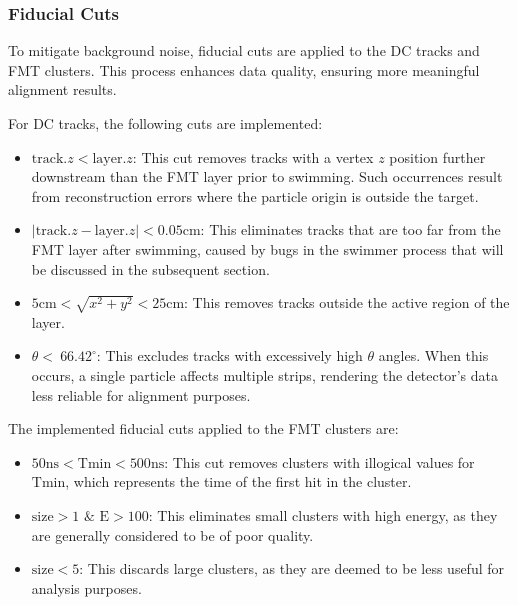 \subsubsection{Fiducial Cuts}
\label{sssec::fiducial_cuts}
    To mitigate background noise, fiducial cuts are applied to the DC tracks and FMT clusters.
    This process enhances data quality, ensuring more meaningful alignment results.

    For DC tracks, the following cuts are implemented:
    \begin{itemize}
        \item
            $\text{track}.z < \text{layer}.z$:
            This cut removes tracks with a vertex $z$ position further downstream than the FMT layer prior to swimming.
            Such occurrences result from reconstruction errors where the particle origin is outside the target.
        \item
            $\mid\text{track}.z - \text{layer}.z\mid < 0.05 \text{cm}$:
            This eliminates tracks that are too far from the FMT layer after swimming, caused by bugs in the swimmer process that will be discussed in the subsequent section.
        \item
            $5 \text{cm} < \sqrt{x^2 + y^2} < 25 \text{cm}$:
            This removes tracks outside the active region of the layer.
        \item
            $\theta < ~66.42^{\circ}$:
            This excludes tracks with excessively high $\theta$ angles.
            When this occurs, a single particle affects multiple strips, rendering the detector's data less reliable for alignment purposes.
    \end{itemize}

    The implemented fiducial cuts applied to the FMT clusters are:
    \begin{itemize}
        \item
            $50 \text{ns} < \text{T}{\text{min}} < 500 \text{ns}$:
            This cut removes clusters with illogical values for $\text{T}{\text{min}}$, which represents the time of the first hit in the cluster.
        \item
            $\text{size} > 1$ $\&$ $\text{E} > 100$:
            This eliminates small clusters with high energy, as they are generally considered to be of poor quality.
        \item
            $\text{size} < 5$:
            This discards large clusters, as they are deemed to be less useful for analysis purposes.
    \end{itemize}
